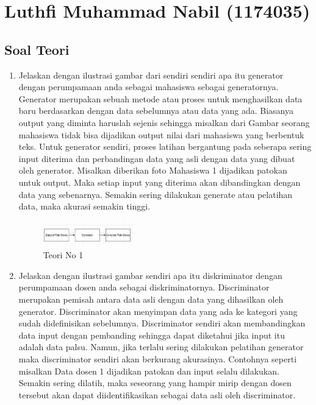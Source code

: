 \section{Luthfi Muhammad Nabil (1174035)}
\subsection{Soal Teori}
\begin{enumerate}
    \item
    Jelaskan dengan ilustrasi gambar dari sendiri sendiri apa itu generator dengan perumpamaan anda sebagai mahasiswa sebagai generatornya.\hfill \break
    Generator merupakan sebuah metode atau proses untuk menghasilkan data baru berdasarkan dengan data sebelumnya atau data yang ada. Biasanya output yang diminta haruslah sejenis sehingga misalkan dari Gambar seorang mahasiswa tidak bisa dijadikan output nilai dari mahasiswa yang berbentuk teks. Untuk generator sendiri, proses latihan bergantung pada seberapa sering input diterima dan perbandingan data yang asli dengan data yang dibuat oleh generator. Misalkan diberikan foto Mahasiswa 1 dijadikan patokan untuk output. Maka setiap input yang diterima akan dibandingkan dengan data yang sebenarnya. Semakin sering dilakukan generate atau pelatihan data, maka akurasi semakin tinggi. 
    \begin{figure}[H]
        \includegraphics[width=4cm]{figures/1174035/chapter8/teori1.png}
        \centering
          \caption{Teori No 1}
    \end{figure}
    \item
    Jelaskan dengan ilustrasi gambar sendiri apa itu diskriminator dengan perumpamaan dosen anda sebagai diskriminatornya.\hfill \break
    Discriminator merupakan pemisah antara data asli dengan data yang dihasilkan oleh generator. Discriminator akan menyimpan data yang ada ke kategori yang sudah didefinisikan sebelumnya. Discriminator sendiri akan membandingkan data input dengan pembanding sehingga dapat diketahui jika input itu adalah data palsu. Namun, jika terlalu sering dilakukan pelatihan generator maka discriminator sendiri akan berkurang akurasinya. Contohnya seperti misalkan Data dosen 1 dijadikan patokan dan input selalu dilakukan. Semakin sering dilatih, maka seseorang yang hampir mirip dengan dosen tersebut akan dapat diidentifikasikan sebagai data asli oleh discriminator. 

\end{enumerate}
